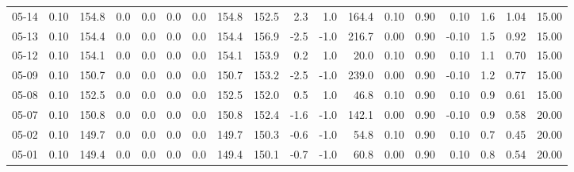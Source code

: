 \begin{threeparttable}
{\begin{tabular}{lrrrrrrrrrrrrrrrrr}
  05-14 &     0.10 & 154.8 &               0.0 &               0.0 &                0.0 &                0.0 & 154.8 & 152.5 &        2.3 &                      1.0 &               164.4 &       0.10 &      0.90 &           0.10 &              1.6 &            1.04 &                  15.00 \\
  05-13 &     0.10 & 154.4 &               0.0 &               0.0 &                0.0 &                0.0 & 154.4 & 156.9 &       -2.5 &                     -1.0 &               216.7 &       0.00 &      0.90 &          -0.10 &              1.5 &            0.92 &                  15.00 \\
  05-12 &     0.10 & 154.1 &               0.0 &               0.0 &                0.0 &                0.0 & 154.1 & 153.9 &        0.2 &                      1.0 &                20.0 &       0.10 &      0.90 &           0.10 &              1.1 &            0.70 &                  15.00 \\
  05-09 &     0.10 & 150.7 &               0.0 &               0.0 &                0.0 &                0.0 & 150.7 & 153.2 &       -2.5 &                     -1.0 &               239.0 &       0.00 &      0.90 &          -0.10 &              1.2 &            0.77 &                  15.00 \\
  05-08 &     0.10 & 152.5 &               0.0 &               0.0 &                0.0 &                0.0 & 152.5 & 152.0 &        0.5 &                      1.0 &                46.8 &       0.10 &      0.90 &           0.10 &              0.9 &            0.61 &                  15.00 \\
  05-07 &     0.10 & 150.8 &               0.0 &               0.0 &                0.0 &                0.0 & 150.8 & 152.4 &       -1.6 &                     -1.0 &               142.1 &       0.00 &      0.90 &          -0.10 &              0.9 &            0.58 &                  20.00 \\
  05-02 &     0.10 & 149.7 &               0.0 &               0.0 &                0.0 &                0.0 & 149.7 & 150.3 &       -0.6 &                     -1.0 &                54.8 &       0.10 &      0.90 &           0.10 &              0.7 &            0.45 &                  20.00 \\
  05-01 &     0.10 & 149.4 &               0.0 &               0.0 &                0.0 &                0.0 & 149.4 & 150.1 &       -0.7 &                     -1.0 &                60.8 &       0.00 &      0.90 &           0.10 &              0.8 &            0.54 &                  20.00 \\

\end{tabular}}
\end{threeparttable}
